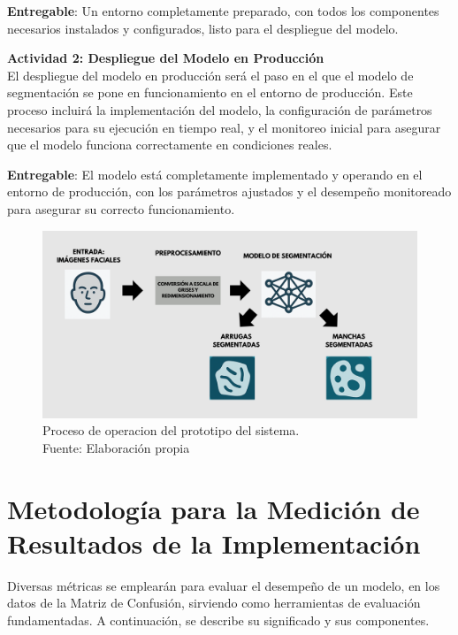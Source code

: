 \textbf{Entregable}: Un entorno completamente preparado, con todos los componentes necesarios instalados y configurados, listo para el despliegue del modelo.

\textbf{Actividad 2: Despliegue del Modelo en Producción}
\\
El despliegue del modelo en producción será el paso en el que el modelo de segmentación se pone en funcionamiento en el entorno de producción. Este proceso incluirá la implementación del modelo, la configuración de parámetros necesarios para su ejecución en tiempo real, y el monitoreo inicial para asegurar que el modelo funciona correctamente en condiciones reales.

\textbf{Entregable}: El modelo está completamente implementado y operando en el entorno de producción, con los parámetros ajustados y el desempeño monitoreado para asegurar su correcto funcionamiento.

\begin{figure}[h]
    \begin{center}
        \includegraphics[width=1\textwidth]{3/figures/Prototipo de Despliegue.png}
        \caption[Proceso de operacion del prototipo del sistema]{Proceso de operacion del prototipo del sistema.\\
        Fuente: Elaboración propia}
        \label{3:fig6}
    \end{center}
\end{figure}

\section{Metodología para la Medición de Resultados de la Implementación}

Diversas métricas se emplearán para evaluar el desempeño de un modelo, en los datos de la Matriz de Confusión, sirviendo como herramientas de evaluación fundamentadas. A continuación, se describe su significado y sus componentes.


